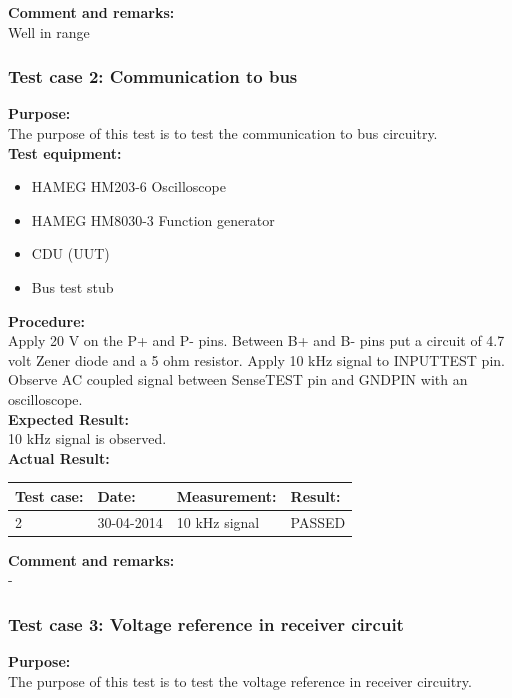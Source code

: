 \textbf{Comment and remarks:}\\
Well in range\\

\subsubsection{Test case 2: Communication to bus}
\textbf{Purpose:}\\
The purpose of this test is to test the communication to bus circuitry.\\

\textbf{Test equipment:}
\begin{itemize}
\item HAMEG HM203-6 Oscilloscope
\item HAMEG HM8030-3 Function generator
\item CDU (UUT)
\item Bus test stub
\end{itemize}

\textbf{Procedure:}\\
Apply 20 V on the P+ and P- pins. Between B+ and B- pins put a circuit of 4.7 volt Zener diode and a 5 ohm resistor. Apply 10 kHz signal to INPUTTEST pin. Observe AC coupled signal between SenseTEST pin and GNDPIN with an oscilloscope.\\

\textbf{Expected Result:}\\
10 kHz signal is observed.\\

\textbf{Actual Result:}\\
\begin{table}[H]
\centering
\begin{tabular}{|p{2cm}|p{2cm}|p{3cm}|p{2cm}|}\hline
\textbf{Test case:} & \textbf{Date:} & \textbf{Measurement:} & \textbf{Result:} \\ \hline
2 & 30-04-2014 & 10 kHz signal & PASSED \\ \hline
\end{tabular}
\end{table}

\textbf{Comment and remarks:}\\
-\\

\subsubsection{Test case 3: Voltage reference in receiver circuit}
\textbf{Purpose:}\\
The purpose of this test is to test the voltage reference in receiver circuitry.\\

